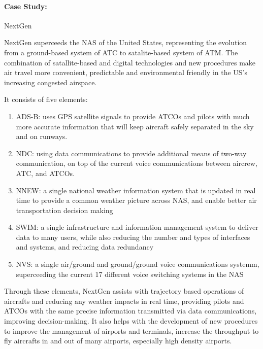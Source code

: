 \paragraph{Case Study:} \gls{NextGen} \cite{skybrary_nextgen}

\gls{NextGen} superceeds the \gls{NAS} of the United States, representing the evolution from a ground-based system of \gls{ATC} to satalite-based system of \gls{ATM}.
The combination of satallite-based and digital technologies and new procedures make air travel more convenient, predictable and environmental friendly in the US's increasing congested airspace.

It consists of five elements:
\begin{enumerate}
    \item \gls{ADS-B}: uses \gls{GPS} satellite signals to provide \glspl{ATCO} and pilots with much more accurate information that will keep aircraft safely separated in the sky and on runways.
    \item \gls{NDC}: using data communications to provide additional means of two-way communication, on top of the current voice communications between aircrew, \gls{ATC}, and \glspl{ATCO}.
    \item \gls{NNEW}: a single national weather information system that is updated in real time to provide a common weather picture across \gls{NAS}, and enable better air transportation decision making
    \item \gls{SWIM}: a single infrastructure and information management system to deliver data to many users, while also reducing the number and types of interfaces and systems, and reducing data redundancy
    \item \gls{NVS}: a single air/ground and ground/ground voice communications systemm, superceeding the current 17 different voice switching systems in the \gls{NAS}
\end{enumerate}

Through these elements, \gls{NextGen} assists with trajectory based operations of aircrafts and reducing any weather impacts in real time, providing pilots and \glspl{ATCO} with the same precise information transmitted via data communications, improving decision-making.
It also helps with the development of new procedures to improve the management of airports and terminals, increase the throughput to fly aircrafts in and out of many airports, especially high density airports.
